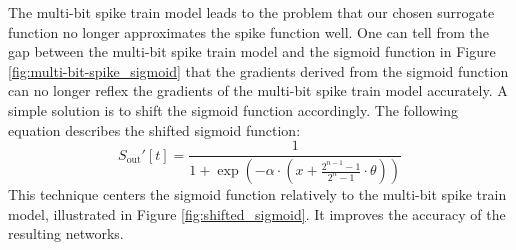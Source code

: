     The multi-bit spike train model leads to the problem that our chosen surrogate function no longer approximates the spike function well. One can tell from the gap between the multi-bit spike train model and the sigmoid function in Figure \ref{fig:multi-bit-spike_sigmoid} that the gradients derived from the sigmoid function can no longer reflex the gradients of the multi-bit spike train model accurately.
    A simple solution is to shift the sigmoid function accordingly. The following equation describes the shifted sigmoid function:
    \begin{equation}
        \label{eq:shifted_sigmoid}
        S_{\text{out}}'[t] = \frac{1}{1 + \exp(-\alpha \cdot (x + \frac{2^{n-1}-1}{2^n-1}\cdot\theta))}
    \end{equation}
    This technique centers the sigmoid function relatively to the multi-bit spike train model, illustrated in Figure \ref{fig:shifted_sigmoid}. It improves the accuracy of the resulting networks. 
